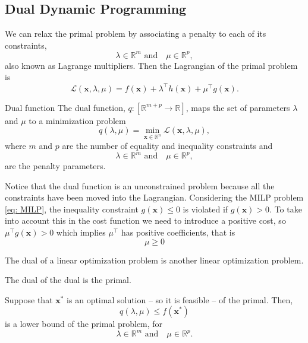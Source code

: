 \subsection{Dual Dynamic Programming}
We can relax the primal problem by associating a penalty to each of its constraints,
\begin{equation}
    \lambda\in\mathbb{R}^{m}\,\, \text{and} \quad \mu\in\mathbb{R}^{p},
\end{equation}
also known as Lagrange multipliers. Then the Lagrangian of the primal problem is
\begin{equation}
    \mathcal{L}(\mathbf{x}, \lambda, \mu) = f(\mathbf{x}) + \lambda^{\intercal}h(\mathbf{x}) + \mu^{\intercal}g(\mathbf{x}).
\end{equation}
\begin{definition}{Dual function}{}
The dual function, $q: \left[\mathbb{R}^{m+p}\rightarrow\mathbb{R}\right]$, maps the set of parameters $\lambda$ and $\mu$ to a minimization problem
\begin{equation}
    q(\lambda, \mu) = \min_{\mathbf{x}\in\mathbb{R}^{n}}\mathcal{L}(\mathbf{x}, \lambda, \mu),
\end{equation}
where $m$ and $p$ are the number of equality and inequality constraints and
\begin{equation}
    \lambda\in\mathbb{R}^{m}\,\, \text{and} \quad \mu\in\mathbb{R}^{p},
\end{equation}
are the penalty parameters.
\end{definition}
Notice that the dual function is an unconstrained problem because all the constraints have been moved into the Lagrangian.
Considering the MILP problem \eqref{eq: MILP}, the inequality constraint $g(\mathbf{x})\leq 0$ is violated if $g(\mathbf{x})>0$. To take into account this in the cost function we need to introduce a positive cost, so $\mu^{\intercal}g(\mathbf{x})>0$ which implies $\mu^{\intercal}$ has positive coefficients, that is
\begin{equation}
    \mu \geq 0
\end{equation}
\begin{theorem}{}{}
The dual of a linear optimization problem is another linear optimization problem.
\end{theorem}
\begin{theorem}{}{}
The dual of the dual is the primal.
\end{theorem}
\begin{theorem}{}{}
Suppose that $\mathbf{x}^{*}$ is an optimal solution -- so it is feasible -- of the primal. Then,
\begin{equation}
    q(\lambda, \mu) \leq f(\mathbf{x}^{*})
\end{equation}
is a lower bound of the primal problem, for
\begin{equation}
    \lambda\in\mathbb{R}^{m}\,\, \text{and} \quad \mu\in\mathbb{R}^{p}.
\end{equation}
\end{theorem}
